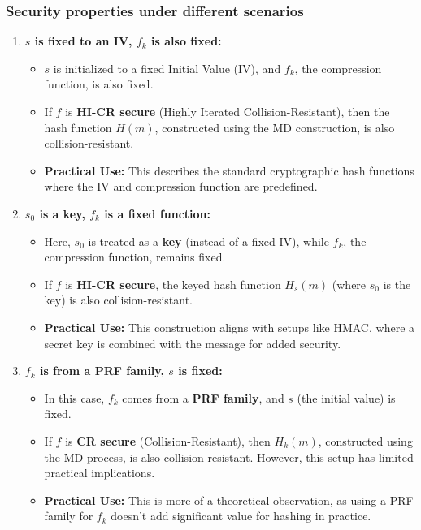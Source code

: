 \subsubsection{Security properties under different scenarios}
\begin{enumerate}
    \item \textbf{\( s \) is fixed to an IV, \( f_k \) is also fixed:}
    \begin{itemize}
        \item \( s \) is initialized to a fixed Initial Value (IV), and \( f_k \), the compression function, is also fixed.
        \item If \( f \) is \textbf{HI-CR secure} (Highly Iterated Collision-Resistant), then the hash function \( H(m) \), constructed using the MD construction, is also collision-resistant.
        \item \textbf{Practical Use:} This describes the standard cryptographic hash functions where the IV and compression function are predefined.
    \end{itemize}
    
    \item \textbf{\( s_0 \) is a key, \( f_k \) is a fixed function:}
    \begin{itemize}
        \item Here, \( s_0 \) is treated as a \textbf{key} (instead of a fixed IV), while \( f_k \), the compression function, remains fixed.
        \item If \( f \) is \textbf{HI-CR secure}, the keyed hash function \( H_s(m) \) (where \( s_0 \) is the key) is also collision-resistant.
        \item \textbf{Practical Use:} This construction aligns with setups like HMAC, where a secret key is combined with the message for added security.
    \end{itemize}
    
    \item \textbf{\( f_k \) is from a PRF family, \( s \) is fixed:}
    \begin{itemize}
        \item In this case, \( f_k \) comes from a \textbf{PRF family}, and \( s \) (the initial value) is fixed.
        \item If \( f \) is \textbf{CR secure} (Collision-Resistant), then \( H_k(m) \), constructed using the MD process, is also collision-resistant. However, this setup has limited practical implications.
        \item \textbf{Practical Use:} This is more of a theoretical observation, as using a PRF family for \( f_k \) doesn’t add significant value for hashing in practice.
    \end{itemize}
\end{enumerate}

